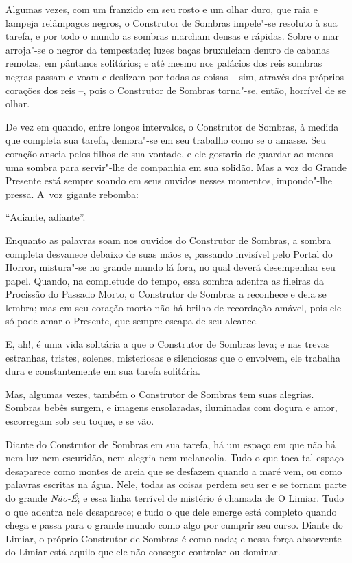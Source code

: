 
Algumas vezes, com um franzido em seu rosto e um olhar duro, que raia e
lampeja relâmpagos negros, o Construtor de Sombras impele"-se resoluto à
sua tarefa, e por todo o mundo as sombras marcham densas e rápidas.
Sobre o mar arroja"-se o negror da tempestade; luzes baças bruxuleiam
dentro de cabanas remotas, em pântanos solitários; e até mesmo nos
palácios dos reis sombras negras passam e voam e deslizam por todas as
coisas -- sim, através dos próprios corações dos reis --, pois o
Construtor de Sombras torna"-se, então, horrível de se olhar.

De vez em quando, entre longos intervalos, o Construtor de Sombras, à
medida que completa sua tarefa, demora"-se em seu trabalho como se o
amasse. Seu coração anseia pelos filhos de sua vontade, e ele gostaria
de guardar ao menos uma sombra para servir"-lhe de companhia em sua
solidão. Mas a voz do Grande Presente está sempre soando em seus ouvidos
nesses momentos, impondo"-lhe pressa. A~voz gigante rebomba:

``Adiante, adiante''.

Enquanto as palavras soam nos ouvidos do Construtor de Sombras, a sombra
completa desvanece debaixo de suas mãos e, passando invisível pelo
Portal do Horror, mistura"-se no grande mundo lá fora, no qual deverá
desempenhar seu papel. Quando, na completude do tempo, essa sombra
adentra as fileiras da Procissão do Passado Morto, o Construtor de
Sombras a reconhece e dela se lembra; mas em seu coração morto não há
brilho de recordação amável, pois ele só pode amar o Presente, que
sempre escapa de seu alcance.

E, ah!, é uma vida solitária a que o Construtor de Sombras leva; e nas
trevas estranhas, tristes, solenes, misteriosas e silenciosas que o
envolvem, ele trabalha dura e constantemente em sua tarefa solitária.

Mas, algumas vezes, também o Construtor de Sombras tem suas alegrias.
Sombras bebês surgem, e imagens ensolaradas, iluminadas com doçura e
amor, escorregam sob seu toque, e se vão.

Diante do Construtor de Sombras em sua tarefa, há um espaço em que não
há nem luz nem escuridão, nem alegria nem melancolia. Tudo o que toca
tal espaço desaparece como montes de areia que se desfazem quando a maré
vem, ou como palavras escritas na água. Nele, todas as coisas perdem seu
ser e se tornam parte do grande \emph{Não-É}; e essa linha terrível de
mistério é chamada de O Limiar. Tudo o que adentra nele desaparece; e
tudo o que dele emerge está completo quando chega e passa para o grande
mundo como algo por cumprir seu curso. Diante do Limiar, o próprio
Construtor de Sombras é como nada; e nessa força absorvente do Limiar
está aquilo que ele não consegue controlar ou dominar.

